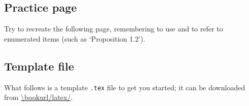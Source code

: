 \newpage
\subsection*{Practice page}
Try to recreate the following page, remembering to use  and  to refer to enumerated items (such as `Proposition 1.2').

\vspace{-10pt}
\begin{center}
\end{center}

\newpage
\subsection*{Template file}
\label{pTeXTemplate}

What follows is a template \texttt{.tex} file to get you started; it can be downloaded from \url{\bookurl/latex/}.

